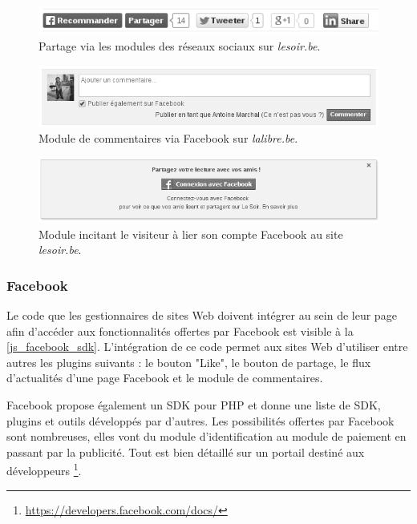 \begin{figure}[h]
	\centering
	\includegraphics[scale=0.75]{figures/modules_sociaux_lesoir_NB.png}
	\caption{\label{etag}Partage via les modules des réseaux sociaux sur \textit{lesoir.be}.}
\end{figure}

\begin{figure}[h]
	\centering
	\includegraphics[scale=0.75]{figures/module_facebook_lalibre_NB.png}
	\caption{\label{etag}Module de commentaires via Facebook sur \textit{lalibre.be}.}
\end{figure}

\begin{figure}[h]
	\centering
	\includegraphics[scale=0.75]{figures/module_facebook_lesoir_NB.png}
	\caption{\label{etag}Module incitant le visiteur à lier son compte Facebook au site \textit{lesoir.be}.}
\end{figure}

\subsubsection{Facebook}
Le code que les gestionnaires de sites Web doivent intégrer au sein de leur page afin d'accéder aux fonctionnalités offertes par Facebook \cite{javascript_facebook_sdk} est visible à la \autoref{js_facebook_sdk}. L'intégration de ce code permet aux sites Web d'utiliser entre autres les plugins suivants : le bouton "Like", le bouton de partage, le flux d'actualités d'une page Facebook et le module de commentaires.

Facebook propose également un SDK pour PHP et donne une liste de SDK, plugins et outils développés par d'autres. Les possibilités offertes par Facebook sont nombreuses, elles vont du module d'identification au module de paiement en passant par la publicité. Tout est bien détaillé sur un portail destiné aux développeurs \footnote{\url{https://developers.facebook.com/docs/}}.

